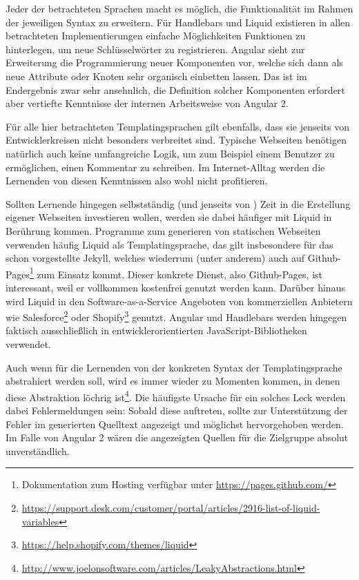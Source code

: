 Jeder der betrachteten Sprachen macht es möglich, die Funktionalität im Rahmen der jeweiligen Syntax zu erweitern. Für Handlebars und Liquid existieren in allen betrachteten Implementierungen einfache Möglichkeiten Funktionen zu hinterlegen, um neue Schlüsselwörter zu registrieren. Angular sieht zur Erweiterung die Programmierung neuer Komponenten vor, welche sich dann als neue Attribute oder Knoten sehr organisch einbetten lassen. Das ist im Endergebnis zwar sehr ansehnlich, die Definition solcher Komponenten erfordert aber vertiefte Kenntnisse der internen Arbeitsweise von Angular 2.

Für alle hier betrachteten Templatingsprachen gilt ebenfalls, dass sie jenseits von Entwicklerkreisen nicht besonders verbreitet sind. Typische Webseiten benötigen natürlich auch keine umfangreiche Logik, um zum Beispiel einem Benutzer zu ermöglichen, einen Kommentar zu schreiben. Im Internet-Alltag werden die Lernenden von diesen Kenntnissen also wohl nicht profitieren.

Sollten Lernende hingegen selbstständig (und jenseits von \idename{}) Zeit in die Erstellung eigener Webseiten investieren wollen, werden sie dabei häufiger mit Liquid in Berührung kommen. Programme zum generieren von statischen Webseiten verwenden häufig Liquid als Templatingsprache, das gilt insbesondere für das schon vorgestellte Jekyll, welches wiederrum (unter anderem) auch auf Github-Pages\footnote{Dokumentation zum Hosting verfügbar unter \url{https://pages.github.com/}} zum Einsatz kommt. Dieser konkrete Dienst, also Github-Pages, ist interessant, weil er vollkommen kostenfrei genutzt werden kann. Darüber hinaus wird Liquid in den Software-as-a-Service Angeboten von kommerziellen Anbietern wie Salesforce\footnote{\url{https://support.desk.com/customer/portal/articles/2916-list-of-liquid-variables}} oder Shopify\footnote{\url{https://help.shopify.com/themes/liquid}} genutzt. Angular und Handlebars werden hingegen faktisch ausschließlich in entwicklerorientierten JavaScript-Bibliotheken verwendet.

Auch wenn für die Lernenden von der konkreten Syntax der Templatingsprache abstrahiert werden soll, wird es immer wieder zu Momenten kommen, in denen diese Abstraktion löchrig ist\footnote{\url{http://www.joelonsoftware.com/articles/LeakyAbstractions.html}}. Die häufigste Ursache für ein solches Leck werden dabei Fehlermeldungen sein: Sobald diese auftreten, sollte zur Unterstützung der Fehler im generierten Quelltext angezeigt und möglichst hervorgehoben werden. Im Falle von Angular 2 wären die angezeigten Quellen für die Zielgruppe absolut unverständlich.

